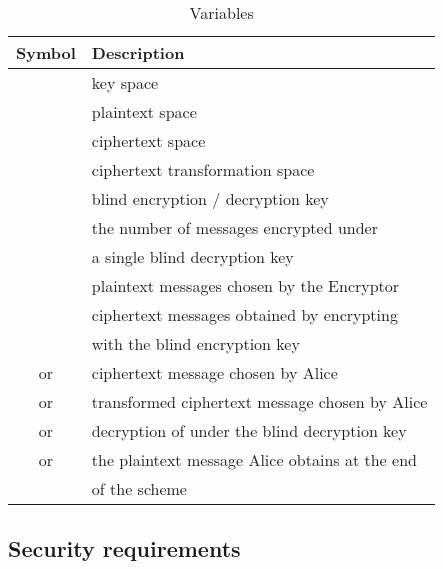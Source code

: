 \documentclass[10pt,journal]{IEEEtran}
\begin{document}
\begin{table}
\caption{Variables}
\begin{tabular}{|c|l|}
\hline
Symbol & Description\\
\hline
\hline
 & key space\\
 & plaintext space\\
 & ciphertext space\\
 & ciphertext transformation space\\
 & blind encryption / decryption key\\
 & the number of messages encrypted under\\ & a single blind decryption key\\
 & plaintext messages chosen by the Encryptor\\
 & ciphertext messages obtained by encrypting \\ & with the blind encryption key\\
 or  & ciphertext message chosen by Alice\\
 or  & transformed ciphertext message chosen by Alice\\
 or  & decryption of  under the blind decryption key\\
 or  & the plaintext message Alice obtains at the end\\ & of the scheme\\
\hline
\end{tabular}
\vspace{4pt}
\label{tab:Table of symbols}
\end{table}



\subsection{Security requirements}
\end{document}
